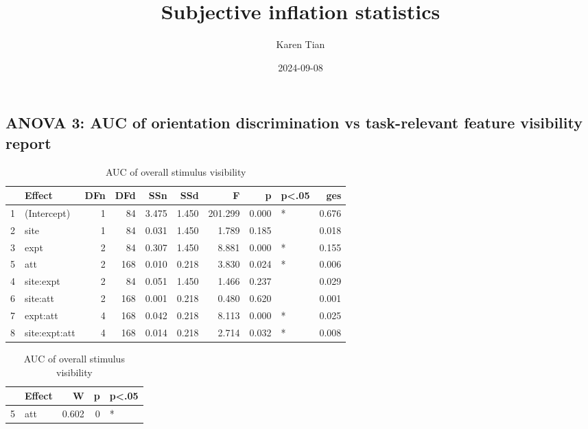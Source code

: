 \documentclass[
]{article}
\title{Subjective inflation statistics}
\author{Karen Tian}
\date{2024-09-08}
\begin{document}
\maketitle

\newpage{}

{
\setcounter{tocdepth}{2}
\tableofcontents
}
\hypertarget{anova-3-auc-of-orientation-discrimination-vs-task-relevant-feature-visibility-report}{%
\subsection{ANOVA 3: AUC of orientation discrimination vs task-relevant
feature visibility
report}\label{anova-3-auc-of-orientation-discrimination-vs-task-relevant-feature-visibility-report}}

\begin{table}[!h]
\centering\caption{\label{tab:anova}AUC of overall stimulus visibility}

\centering
\begin{tabular}[t]{llrrrrrrlr}
\toprule
  & Effect & DFn & DFd & SSn & SSd & F & p & p<.05 & ges\\
\midrule
1 & (Intercept) & 1 & 84 & 3.475 & 1.450 & 201.299 & 0.000 & * & 0.676\\
 
2 & site & 1 & 84 & 0.031 & 1.450 & 1.789 & 0.185 &  & 0.018\\
 
3 & expt & 2 & 84 & 0.307 & 1.450 & 8.881 & 0.000 & * & 0.155\\
 
5 & att & 2 & 168 & 0.010 & 0.218 & 3.830 & 0.024 & * & 0.006\\
 
4 & site:expt & 2 & 84 & 0.051 & 1.450 & 1.466 & 0.237 &  & 0.029\\
 
6 & site:att & 2 & 168 & 0.001 & 0.218 & 0.480 & 0.620 &  & 0.001\\
 
7 & expt:att & 4 & 168 & 0.042 & 0.218 & 8.113 & 0.000 & * & 0.025\\
 
8 & site:expt:att & 4 & 168 & 0.014 & 0.218 & 2.714 & 0.032 & * & 0.008\\
\bottomrule
\end{tabular}
\centering
\begin{tabular}[t]{llrrl}
\toprule
  & Effect & W & p & p<.05\\
\midrule
5 & att & 0.602 & 0 & *\\
 

\end{tabular}
\end{table}
\end{document}
